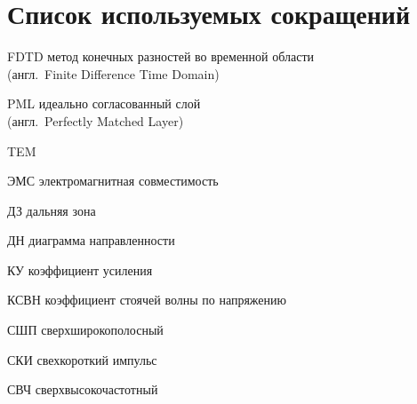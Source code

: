 \chapter*{Список используемых сокращений}

\begin{abbrevlist}
  \item[FDTD] метод конечных разностей во временной области\\
              (англ.~Finite Difference Time Domain)
  \item[PML]  идеально согласованный слой\\
              (англ.~Perfectly Matched Layer)
  \item[TEM]  \FUZZ{[...]}
  \item[ЭМС]  электромагнитная совместимость
  \item[ДЗ]   дальняя зона
  \item[ДН]   диаграмма направленности
  \item[КУ]   коэффициент усиления
  \item[КСВН] коэффициент стоячей волны по напряжению
  \item[СШП]  сверхширокополосный
  \item[СКИ]  свехкороткий импульс
  \item[СВЧ]  сверхвысокочастотный
\end{abbrevlist}
